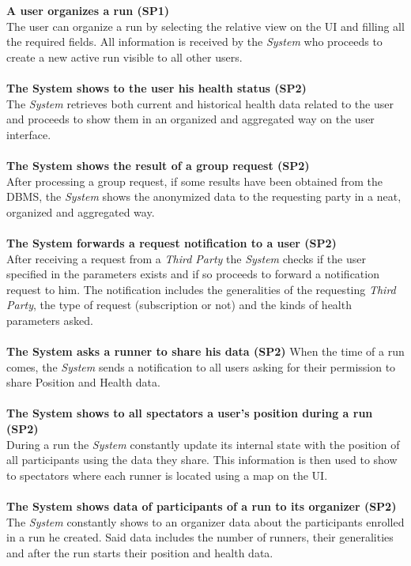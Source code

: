 \documentclass[titlepage]{article}
\begin{document}
{\bf A user organizes a run (SP1)}\\
The user can organize a run by selecting the relative view on the UI and filling all the required fields. All information is received by the {\it System} who proceeds to create a new active run visible to all other users.\\ \\
{\bf The System shows to the user his health status (SP2)} \\
The {\it System} retrieves both current and historical health data related to the user and proceeds to show them in an organized and aggregated way on the user interface.\\ \\
{\bf The System shows the result of a group request (SP2)} \\
After processing a group request, if some results have been obtained from the DBMS, the {\it System} shows the anonymized data to the requesting party in a neat, organized and aggregated way.\\ \\
{\bf The System forwards a request notification to a user (SP2)} \\
After receiving a request from a {\it Third Party} the {\it System} checks if the user specified in the parameters exists and if so proceeds to forward a notification request to him. The notification includes the generalities of the requesting {\it Third Party}, the type of request (subscription or not) and the kinds of health parameters asked.\\ \\
{\bf The System asks a runner to share his data (SP2)}
When the time of a run comes, the {\it System} sends a notification to all users asking for their permission to share Position and Health data.\\ \\
{\bf The System shows to all spectators a user’s position during a run (SP2)} \\
During a run the {\it System} constantly update its internal state with the position of all participants using the data they share. This information is then used to show to spectators where each runner is located using a map on the UI.\\ \\
{\bf The System shows data of participants of a run to its organizer (SP2)} \\
The {\it System} constantly shows to an organizer data about the participants enrolled in a run he created. Said data includes the number of runners, their generalities and after the run starts their position and health data. \\ \\
\end{document}
